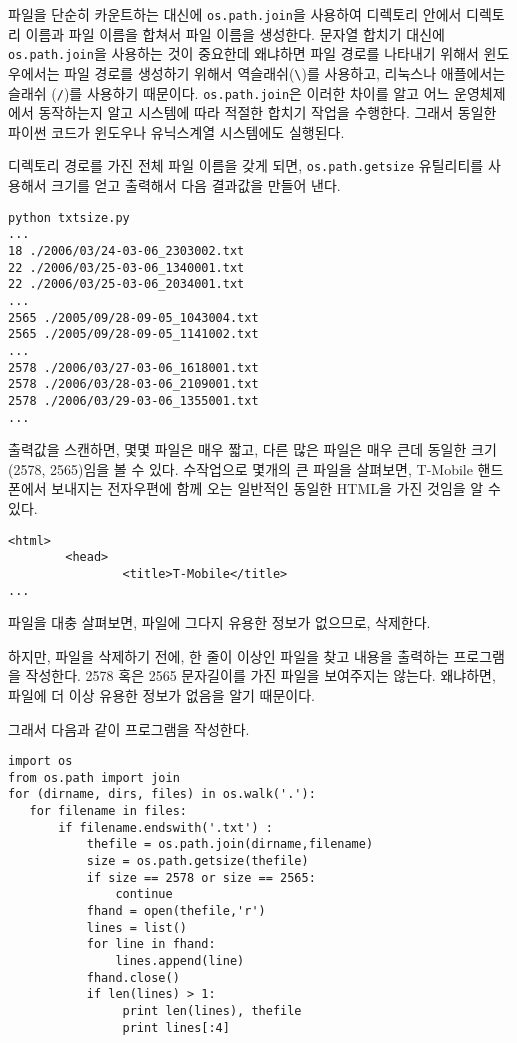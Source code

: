파일을 단순히 카운트하는 대신에 {\tt os.path.join}을 사용하여 디렉토리 안에서 
디렉토리 이름과 파일 이름을 합쳐서 파일 이름을 생성한다.
문자열 합치기 대신에 {\tt os.path.join}을 사용하는 것이 중요한데 왜냐하면
파일 경로를 나타내기 위해서 윈도우에서는 파일 경로를 생성하기 위해서 역슬래쉬(\verb"\")를 사용하고,
리눅스나 애플에서는 슬래쉬 (\verb"/")를 사용하기 때문이다.
{\tt os.path.join}은 이러한 차이를 알고 어느 운영체제에서 동작하는지 알고 시스템에 따라
적절한 합치기 작업을 수행한다. 그래서 동일한 파이썬 코드가 윈도우나 유닉스계열 시스템에도 실행된다.

디렉토리 경로를 가진 전체 파일 이름을 갖게 되면, {\tt os.path.getsize} 유틸리티를 사용해서
크기를 얻고 출력해서 다음 결과값을 만들어 낸다.

\beforeverb
\begin{verbatim}
python txtsize.py
...
18 ./2006/03/24-03-06_2303002.txt
22 ./2006/03/25-03-06_1340001.txt
22 ./2006/03/25-03-06_2034001.txt
...
2565 ./2005/09/28-09-05_1043004.txt
2565 ./2005/09/28-09-05_1141002.txt
...
2578 ./2006/03/27-03-06_1618001.txt
2578 ./2006/03/28-03-06_2109001.txt
2578 ./2006/03/29-03-06_1355001.txt
...
\end{verbatim}
\afterverb
%


출력값을 스캔하면, 몇몇 파일은 매우 짧고, 다른 많은 파일은 매우 큰데 동일한 크기(2578, 2565)임을 볼 수 있다.
수작업으로 몇개의 큰 파일을 살펴보면, 
T-Mobile 핸드폰에서 보내지는 전자우편에 함께 오는 일반적인 동일한 HTML을 가진 것임을 알 수 있다.  

\beforeverb
\begin{verbatim}
<html>
        <head>
                <title>T-Mobile</title>
...
\end{verbatim}
\afterverb
%

파일을 대충 살펴보면, 파일에 그다지 유용한 정보가 없으므로, 삭제한다.

하지만, 파일을 삭제하기 전에, 한 줄이 이상인 파일을 찾고 내용을 출력하는 프로그램을 작성한다.
2578 혹은 2565 문자길이를 가진 파일을 보여주지는 않는다. 왜냐하면, 파일에 더 이상 유용한 정보가 없음을 알기 때문이다.

그래서 다음과 같이 프로그램을 작성한다.

\beforeverb
\begin{verbatim}
import os
from os.path import join
for (dirname, dirs, files) in os.walk('.'):
   for filename in files:
       if filename.endswith('.txt') :
           thefile = os.path.join(dirname,filename)
           size = os.path.getsize(thefile)
           if size == 2578 or size == 2565:
               continue
           fhand = open(thefile,'r')
           lines = list()
           for line in fhand:
               lines.append(line)
           fhand.close()
           if len(lines) > 1:
                print len(lines), thefile
                print lines[:4]
\end{verbatim}
\afterverb
%

